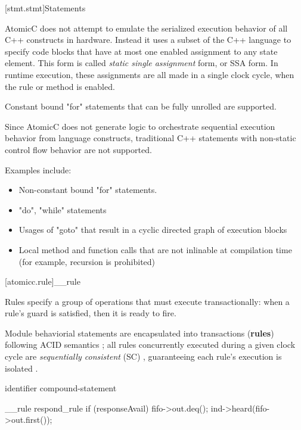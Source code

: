 [stmt.stmt]{Statements}%


AtomicC does not attempt to emulate the serialized execution
behavior of all C++ constructs in hardware.
Instead it uses a subset of the C++ language to specify
code blocks that have at most
one enabled assignment to any state element.
This form is called \textit{static single assignment} form,
or SSA form\cite{Alpern:1988}.
In runtime execution, these assignments are
all made in a single clock cycle, when the rule or method
is enabled.

Constant bound "for" statements that can be fully unrolled are supported.

Since AtomicC does not generate logic to orchestrate sequential execution behavior from
language constructs,
traditional C++ statements with non-static control flow behavior are not supported.

Examples include:
\begin{itemize}
\item Non-constant bound "for" statements.  
\item "do", "while" statements
\item Usages of "goto" that result in a cyclic directed graph of execution blocks
\item Local method and function calls that are not inlinable at compilation time (for example, recursion is prohibited)
\end{itemize}


[atomicc.rule]{__rule}

Rules specify a group of operations that must
execute transactionally: when a rule's guard
is satisfied, then it is ready to fire.

Module behaviorial statements are encapsulated into transactions (\textbf{rules})
following ACID semantics
\cite{NikhilSemantics,GrayR93};
all rules concurrently executed during a given clock cycle are
\textit{sequentially consistent} (SC) \cite{Lamport:1979:MMC:1311099.1311750},
guaranteeing each rule's execution is isolated
\cite[Sec.~7.1]{GrayR93}.

\begin{bnf}
\br
     identifier  compound-statement\br

\end{bnf}

\begin{example}
\begin{codeblock}
     __rule respond_rule if (responseAvail) {
         fifo->out.deq();
         ind->heard(fifo->out.first());
     }
\end{codeblock}
\end{example}


